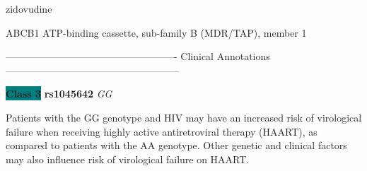 \documentclass{resume} %
\begin{document}
\begin{rSection}{ zidovudine }
\begin{rSubsection}{ ABCB1 }{ ATP-binding cassette, sub-family B (MDR/TAP), member 1 }{}{}
\item[]

\item[] ---------------------------------------------------- Clinical Annotations -----------------------------------------------------\newline
\item \textbf{\colorbox{teal} {Class 3}} \textbf{ rs1045642 } \textit{ GG }
\item[] Patients with the GG genotype and HIV may have an increased risk of virological failure when receiving highly active antiretroviral therapy (HAART), as compared to patients with the AA genotype. Other genetic and clinical factors may also influence risk of virological failure on HAART.
\end{rSubsection}

\end{rSection}
\end{document}
